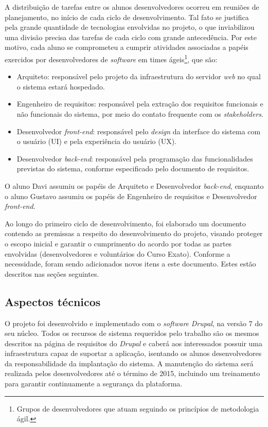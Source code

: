 \documentclass[a4paper]{article}
\begin{document}
A distribuição de tarefas entre os alunos desenvolvedores ocorreu em reuniões de planejamento, no início de cada ciclo de desenvolvimento. Tal fato se justifica pela grande quantidade de tecnologias envolvidas no projeto, o que inviabilizou uma divisão precisa das tarefas de cada ciclo com grande antecedência. Por este motivo, cada aluno se comprometeu a cumprir atividades associadas a papéis exercidos por desenvolvedores de \textit{software} em times ágeis\footnote{Grupos de desenvolvedores que atuam seguindo os princípios de metodologia ágil.}, que são:
\begin{itemize}
\item Arquiteto: responsável pelo projeto da infraestrutura do servidor \textit{web} no qual o sistema estará hospedado.
\item Engenheiro de requisitos: responsável pela extração dos requisitos funcionais e não funcionais do sistema, por meio do contato frequente com os \textit{stakeholders}.
\item Desenvolvedor \textit{front-end}: responsável pelo \textit{design} da interface do sistema com o usuário (UI) e pela experiência do usuário (UX).
\item Desenvolvedor \textit{back-end}: responsável pela programação das funcionalidades previstas do sistema, conforme especificado pelo documento de requisitos.
\end{itemize}

O aluno Davi assumiu os papéis de Arquiteto e Desenvolvedor \textit{back-end}, enquanto o aluno Gustavo assumiu os papéis de Engenheiro de requisitos e Desenvolvedor \textit{front-end}.

Ao longo do primeiro ciclo de desenvolvimento, foi elaborado um documento contendo as premissas a respeito do desenvolvimento do projeto, visando proteger o escopo inicial e garantir o cumprimento do acordo por todas as partes envolvidas (desenvolvedores e voluntários do Curso Exato). Conforme a necessidade, foram sendo adicionados novos itens a este documento. Estes estão descritos nas seções seguintes.

\subsection{Aspectos técnicos}\label{ssec:tech}

O projeto foi desenvolvido e implementado com o \textit{software} \textit{Drupal}, na versão 7 do seu núcleo. Todos os recursos de sistema requeridos pelo trabalho são os mesmos descritos na página de requisitos do \textit{Drupal} \cite{requirements} e caberá aos interessados possuir uma infraestrutura capaz de suportar a aplicação, isentando os alunos desenvolvedores da responsabilidade da implantação do sistema. A manutenção do sistema será realizada pelos desenvolvedores até o término de 2015, incluindo um treinamento para garantir continuamente a segurança da plataforma.
\end{document}
